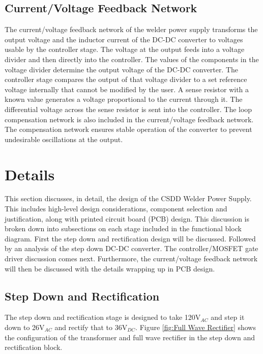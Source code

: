 \documentclass[11pt]{article}
\begin{document}
    \subsection{Current/Voltage Feedback Network}
        The current/voltage feedback network of the welder power supply transforms the output voltage and the inductor current of the DC-DC converter to voltages usable by the controller stage. The voltage at the output feeds into a voltage divider and then directly into the controller. The values of the components in the voltage divider determine the output voltage of the DC-DC converter. The controller stage compares the output of that voltage divider to a set reference voltage internally that cannot be modified by the user. A sense resistor with a known value generates a voltage proportional to the current through it. The differential voltage across the sense resistor is sent into the controller. The loop compensation network is also included in the current/voltage feedback network. The compensation network ensures stable operation of the converter to prevent undesirable oscillations at the output.
        
\section{Details}

\noindent This section discusses, in detail, the design of the CSDD Welder Power Supply. This includes high-level design considerations, component selection and justification, along with printed circuit board (PCB) design. This discussion is broken down into subsections on each stage included in the functional block diagram. First the step down and rectification design will be discussed. Followed by an analysis of the step down DC-DC converter. The controller/MOSFET gate driver discussion comes next. Furthermore, the current/voltage feedback network will then be discussed with the details wrapping up in PCB design. 

    \subsection{Step Down and Rectification}
        The step down and rectification stage is designed to take 120V$_{AC}$ and step it down to 26V$_{AC}$ and rectify that to 36V$_{DC}$. Figure \ref{fig:Full Wave Rectifier} shows the configuration of the transformer and full wave rectifier in the step down and rectification block. 
        
\end{document}
